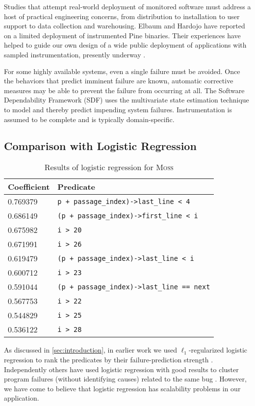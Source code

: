 \documentclass[draft]{sig-alternate}
\newcommand{\moss}{\textsc{Moss}\xspace}
\begin{document}
Studies that attempt real-world deployment of monitored software must
address a host of practical engineering concerns, from distribution to
installation to user support to data collection and warehousing.
Elbaum and Hardojo \cite{Elbaum:2003:DISATA} have reported on a
limited deployment of instrumented Pine binaries.  Their experiences
have helped to guide our own design of a wide public deployment of
applications with sampled instrumentation, presently underway
\cite{Liblit:2003:CBIP}.

For some highly available systems, even a single failure must be
avoided.  Once the behaviors that predict imminent failure are known,
automatic corrective measures may be able to prevent the failure from
occurring at all.  The Software Dependability Framework (SDF)
\cite{Gross:2003:PSMUST} uses the multivariate state estimation
technique to model and thereby predict impending system failures.
Instrumentation is assumed to be complete and is typically
domain-specific.

\subsection{Comparison with Logistic Regression}
\label{sec:comparison}

\begin{table}
\caption{Results of logistic regression for \moss}
\label{tab:logregression}
\centering
\small
\begin{tabular}{ll}
  \toprule
  Coefficient & Predicate \\
  \midrule
  0.769379 & \verb|p + passage_index)->last_line < 4| \\
  0.686149 & \verb|(p + passage_index)->first_line < i| \\
  0.675982 & \verb|i > 20| \\
  0.671991 & \verb|i > 26| \\
  0.619479 & \verb|(p + passage_index)->last_line < i| \\
  0.600712 & \verb|i > 23| \\
  0.591044 & \verb|(p + passage_index)->last_line == next| \\
  0.567753 & \verb|i > 22| \\
  0.544829 & \verb|i > 25| \\
  0.536122 & \verb|i > 28| \\
  \bottomrule
\end{tabular}
\end{table}

As discussed in \autoref{sec:introduction}, in earlier work 
we used $\ell_1$-regularized logistic regression
to rank the predicates by their
failure-prediction strength \cite{PLDI`03*141,NIPS2003_AP05}.  Independently others have used
logistic regression with good results to cluster program failures (without
identifying causes) related to the same bug \cite{ICSE`03*465}.  However, we have come
to believe that logistic regression has scalability problems in our application.
\end{document}
